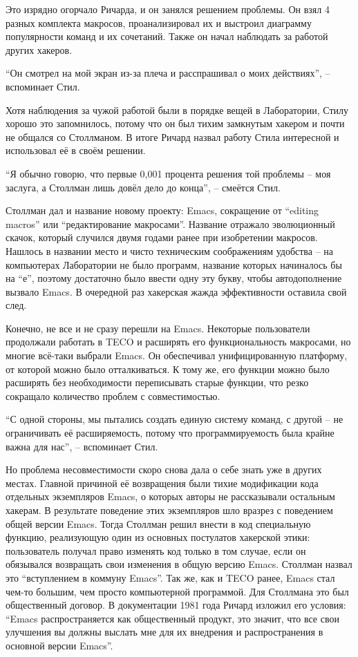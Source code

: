 Это изрядно огорчало Ричарда, и он занялся решением проблемы. Он взял 4 разных комплекта макросов, проанализировал их и выстроил диаграмму популярности команд и их сочетаний. Также он начал наблюдать за работой других хакеров.

\enquote{Он смотрел на мой экран из-за плеча и расспрашивал о моих действиях}, -- вспоминает Стил.

Хотя наблюдения за чужой работой были в порядке вещей в Лаборатории, Стилу хорошо это запомнилось, потому что он был тихим замкнутым хакером и почти не общался со Столлманом. В итоге Ричард назвал работу Стила интересной и использовал её в своём решении.

\enquote{Я обычно говорю, что первые 0,001 процента решения той проблемы -- моя заслуга, а Столлман лишь довёл дело до конца}, -- смеётся Стил.

Столлман дал и название новому проекту: Emacs, сокращение от \enquote{editing macros} или \enquote{редактирование макросами}. Название отражало эволюционный скачок, который случился двумя годами ранее при изобретении макросов. Нашлось в названии место и чисто техническим соображениям удобства -- на компьютерах Лаборатории не было программ, название которых начиналось бы на \enquote{е}, поэтому достаточно было ввести одну эту букву, чтобы автодополнение вызвало Emacs. В очередной раз хакерская жажда эффективности оставила свой след.

Конечно, не все и не сразу перешли на Emacs. Некоторые пользователи продолжали работать в TECO и расширять его функциональность макросами, но многие всё-таки выбрали Emacs. Он обеспечивал унифицированную платформу, от которой можно было отталкиваться. К тому же, его функции можно было расширять без необходимости переписывать старые функции, что резко сокращало количество проблем с совместимостью.

\enquote{С одной стороны, мы пытались создать единую систему команд, с другой -- не ограничивать её расширяемость, потому что программируемость была крайне важна для нас}, -- вспоминает Стил.

Но проблема несовместимости скоро снова дала о себе знать уже в других местах. Главной причиной её возвращения были тихие модификации кода отдельных экземпляров Emacs, о которых авторы не рассказывали остальным хакерам. В результате поведение этих экземпляров шло вразрез с поведением общей версии Emacs. Тогда Столлман решил внести в код специальную функцию, реализующую один из основных постулатов хакерской этики: пользователь получал право изменять код только в том случае, если он обязывался возвращать свои изменения в общую версию Emacs. Столлман назвал это \enquote{вступлением в коммуну Emacs}. Так же, как и TECO ранее, Emacs стал чем-то большим, чем просто компьютерной программой. Для Столлмана это был общественный договор. В документации 1981 года Ричард изложил его условия: \enquote{Emacs распространяется как общественный продукт, это значит, что все свои улучшения вы должны выслать мне для их внедрения и распространения в основной версии Emacs}.

